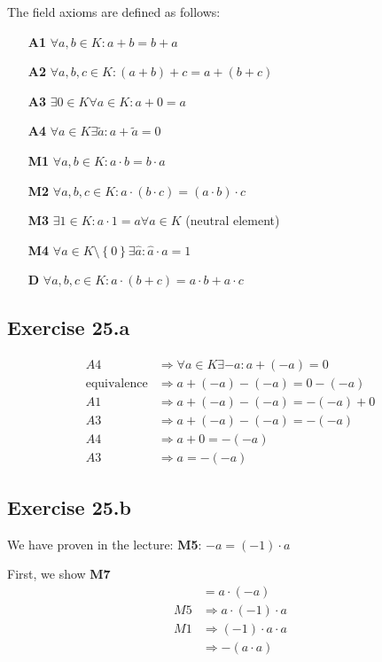 \documentclass[a4paper]{article}
\theoremstyle{definition}
\newcommand\set[1]{\left\{#1\right\}}
\begin{document}
The field axioms are defined as follows:
\begin{itemize}
  \item[\textbf{A1}] $\forall a,b \in K: a + b = b + a$
  \item[\textbf{A2}] $\forall a,b,c \in K: (a + b) + c = a + (b + c)$
  \item[\textbf{A3}] $\exists 0 \in K \forall a \in K: a + 0 = a$
  \item[\textbf{A4}] $\forall a \in K \exists \tilde{a}: a + \tilde{a} = 0$
  \item[\textbf{M1}] $\forall a,b \in K: a \cdot b = b \cdot a$
  \item[\textbf{M2}] $\forall a,b,c \in K: a \cdot (b \cdot c) = (a \cdot b) \cdot c$
  \item[\textbf{M3}] $\exists 1 \in K: a \cdot 1 = a \forall a \in K$ (neutral element)
  \item[\textbf{M4}] $\forall a \in K \setminus \set{0} \exists \hat a: \hat a \cdot a = 1$
  \item[\textbf{D}] $\forall a,b,c \in K: a \cdot (b + c) = a \cdot b + a \cdot c$
\end{itemize}

\subsection{Exercise 25.a}

\begin{align*}
                  A4 &\Rightarrow \forall a \in K \exists -a: a + (-a) = 0 \\
  \text{equivalence} &\Rightarrow a + (-a) - (-a) = 0 - (-a) \\
                  A1 &\Rightarrow a + (-a) - (-a) = -(-a) + 0 \\
                  A3 &\Rightarrow a + (-a) - (-a) = -(-a) \\
                  A4 &\Rightarrow a + 0 = -(-a) \\
                  A3 &\Rightarrow a = -(-a)
\end{align*}

\subsection{Exercise 25.b}

We have proven in the lecture: \textbf{M5}: $-a = (-1) \cdot a$


First, we show \textbf{M7}
\begin{align*}
     &= a \cdot (-a) \\
  M5 &\Rightarrow a \cdot (-1) \cdot a \\
  M1 &\Rightarrow (-1) \cdot a \cdot a \\
     &\Rightarrow - (a \cdot a) \\
\end{align*}
\end{document}
